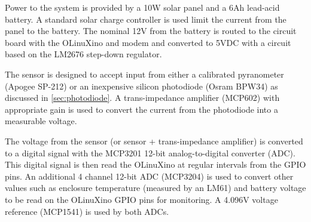 Power to the system is provided by a 10W solar panel and a 6Ah
lead-acid battery.
A standard solar charge controller is used limit the current from the
panel to the battery.
The nominal 12V from the battery is routed to the circuit board with
the OLinuXino and modem and converted to 5VDC with a circuit based on
the LM2676 step-down regulator.

The sensor is designed to accept input from either a calibrated
pyranometer (Apogee SP-212) or an inexpensive silicon photodiode
(Osram BPW34) as discussed in \cref{sec:photodiode}.
A trans-impedance amplifier (MCP602) with appropriate gain is used to
convert the current from the photodiode into a measurable voltage.

The voltage from the sensor (or sensor + trans-impedance amplifier) is
converted to a digital signal with the MCP3201 12-bit
analog-to-digital converter (ADC).
This digital signal is then read the OLinuXino at regular intervals
from the GPIO pins.
An additional 4 channel 12-bit ADC (MCP3204) is used to convert other
values such as enclosure temperature (measured by an LM61) and battery
voltage to be read on the OLinuXino GPIO pins for monitoring.
A 4.096V voltage reference (MCP1541) is used by both ADCs.

